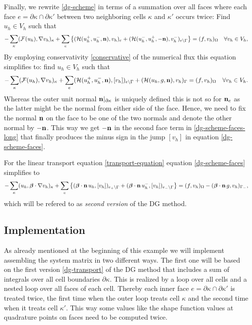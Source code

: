 \documentclass[11pt]{article}
\begin{document}
Finally, we rewrite \eqref{dg-scheme} in terms of a summation over all
faces where each face $e=\partial \kappa\cap\partial \kappa'$
between two neighboring cells $\kappa$ and $\kappa'$ occurs twice:
Find $u_h\in V_h$ such that
\begin{equation}\label{dg-scheme-faces-long}
  -\sum_\kappa({\mathcal F}(u_h),\nabla v_h)_\kappa+\sum_e\left\{({\mathcal H}(u_h^+,u_h^-,{\bf n}), v_h)_e+({\mathcal H}(u_h^-, u_h^+,-{\bf n}), v_h^-)_{e\setminus\Gamma}\right\}=(f,v_h)_\Omega \quad\forall v_h\in V_h,
\end{equation}
By employing conservativity \eqref{conservative} of the numerical flux
this equation simplifies to: find $u_h\in V_h$ such that
\begin{equation}\label{dg-scheme-faces}
  -\sum_\kappa({\mathcal F}(u_h),\nabla v_h)_\kappa+\sum_e({\mathcal H}(u_h^+,u_h^-,{\bf n}), [v_h])_{e\setminus\Gamma}+({\mathcal H}(u_h,g,{\bf n}), v_h)_{\Gamma}=(f,v_h)_\Omega \quad\forall v_h\in V_h.
\end{equation}
Whereas the outer unit normal ${\bf n}|_{\partial\kappa}$ is uniquely
defined this is not so for ${\bf n}_e$ as the latter might be the
normal from either side of the face. Hence, we need to fix the normal
${\bf n}$ on the face to be one of the two normals and denote the
other normal by $-{\bf n}$.  This way we get $-{\bf n}$ in the second
face term in \eqref{dg-scheme-faces-long} that finally produces the
minus sign in the jump $[v_h]$ in equation \eqref{dg-scheme-faces}.

For the linear transport equation \eqref{transport-equation}
equation \eqref{dg-scheme-faces} simplifies to
\begin{equation}\label{dg-transport-gamma}
  -\sum_\kappa(u_h,\boldsymbol\beta\cdot\nabla v_h)_\kappa+\sum_e\left\{(\boldsymbol\beta\cdot{\bf n}\, u_h, [v_h])_{e_+\setminus\Gamma}+(\boldsymbol\beta\cdot{\bf n}\, u_h^-, [v_h])_{e_-\setminus\Gamma}\right\}=(f,v_h)_\Omega-(\boldsymbol\beta\cdot{\bf n}\, g, v_h)_{\Gamma_-},
\end{equation}
which will be refered to as \emph{second version} of the DG method.
\subsection{Implementation}
As already mentioned at the beginning of this example we will
implement assembling the system matrix in two different ways.
The first one will be based on the first version \eqref{dg-transport}
of the DG method that includes a sum of integrals over all cell
boundaries $\partial\kappa$. This is realized by a loop over all cells and
a nested loop over all faces of each cell.  Thereby each inner face
$e=\partial\kappa\cap\partial \kappa'$ is treated twice, the first
time when the outer loop treats cell $\kappa$ and the second time when it
treats cell $\kappa'$. This way some values like the shape function
values at quadrature points on faces need to be computed twice.
\end{document}
